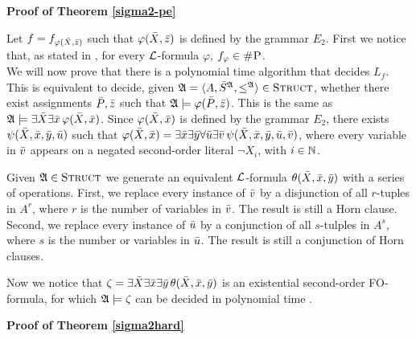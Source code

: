 \textbf{Proof of Theorem \ref{sigma2-pe}}

Let $f = f_{\varphi(\bar{X},\bar{z})}$ such that $\varphi(\bar{X},\bar{z})$ is defined by the grammar $E_2$. First we notice that, as stated in \cite{DBLP:journals/jcss/SalujaST95}, for every $\L$-formula $\varphi$, $f_{\varphi}\in\text{\sc \#P}$.\\

We will now prove that there is a polynomial time algorithm that decides $L_{f}$. This is equivalent to decide, given $\mathfrak{A}= \langle A, \bar{S}^{\mathfrak{A}}, \leq^{\mathfrak{A}} \rangle\in\text{\sc Struct}$, whether there exist assignments $\bar{P},\bar{z}$ such that $\mathfrak{A}\models\varphi(\bar{P},\bar{z})$. This is the same as $\mathfrak{A}\models\exists\bar{X}\exists\bar{x}\,\varphi(\bar{X},\bar{x})$. Since $\varphi(\bar{X},\bar{x})$ is defined by the grammar $E_2$, there exists $\psi(\bar{X},\bar{x},\bar{y},\bar{u})$ such that $\varphi(\bar{X},\bar{x}) = \exists\bar{x}\exists\bar{y}\forall\bar{u}\exists\bar{v}\,\psi(\bar{X},\bar{x},\bar{y},\bar{u},\bar{v})$, where every variable in $\bar{v}$ appears on a negated second-order literal $\neg X_i$, with $i\in\mathbb{N}$.

Given $\mathfrak{A}\in\text{\sc Struct}$ we generate an equivalent $\L$-formula $\theta(\bar{X},\bar{x},\bar{y})$ with a series of operations. First, we replace every instance of $\bar{v}$ by a disjunction of all $r$-tuples in $A^r$, where $r$ is the number of variables in $\bar{v}$. The result is still a Horn clause. Second, we replace every instance of $\bar{u}$ by a conjunction of all $s$-tulples in $A^s$, where $s$ is the number or variables in $\bar{u}$. The result is still a conjunction of Horn clauses.

Now we notice that $\zeta = \exists\bar{X}\exists\bar{x}\exists\bar{y}\,\theta(\bar{X},\bar{x},\bar{y})$ is an existential second-order FO-formula, for which $\mathfrak{A}\models\zeta$ can be decided in polynomial time \cite{DBLP:conf/stacs/Gradel91}.
		
\textbf{Proof of Theorem \ref{sigma2hard}}


